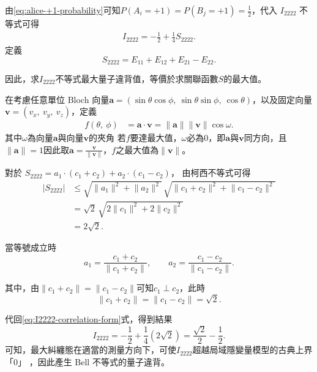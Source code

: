 \documentclass[12pt, a4paper, twoside, reqno]{article}
\begin{document}
\noindent 由\eqref{eq:alice-+1-probability}可知$P(A_i=+1) = P(B_j=+1) = \frac{1}{2}$，代入 $I_{2222}$ 不等式可得
\begin{equation}
\begin{aligned}
    I_{2222} = -\frac{1}{2}+\frac{1}{4}S_{2222}.
\end{aligned}
\label{eq:I2222-correlation-form}
\end{equation}
定義
\begin{equation}
    S_{2222} = E_{11}+E_{12}+E_{21}-E_{22}.
\end{equation}

\noindent 因此，求$I_{2222}$不等式最大量子違背值，等價於求關聯函數$S$的最大值。

\indent 在考慮任意單位 Bloch 向量$\bm{a} = (\sin\theta\cos\phi,~\sin\theta\sin\phi,~\cos\theta)$，以及固定向量$\bm{v} = (v_x,~v_y,~v_z)$，定義
\[
\begin{aligned}
    f(\theta,~\phi) 
    &= \bm{a}\cdot\bm{v}=\|\bm{a}\|\|\bm{v}\|\cos\omega.
\end{aligned}
\]
其中$\omega$為向量$\bm{a}$與向量$\bm{v}$的夾角
\noindent 若$f$要達最大值，$\omega$必為0，即$\bm{a}$與$\bm{v}$同方向，且$\|\bm{a}\|=1$因此取$\bm{a}=\frac{\bm{v}}{\|\bm{v}\|}$，$f$之最大值為$\|\bm{v}\|$。

\noindent 對於
\(S_{2222}
= a_1\cdot(c_1+c_2)+a_2\cdot(c_1-c_2)\)，
由柯西不等式可得
\begin{equation}
\begin{aligned}
\lvert S_{2222}\rvert
&\leq
\sqrt{\lVert a_1\rVert^2+\lVert a_2\rVert^2}\,
\sqrt{
  \lVert c_1+c_2\rVert^2+
  \lVert c_1-c_2\rVert^2
}                                                   \\
&=
\sqrt{2}\,
\sqrt{2\lVert c_1\rVert^2+2\lVert c_2\rVert^2}      \\
&= 2\sqrt{2}.
\end{aligned}
\label{eq:chsh-bound}
\end{equation}

\noindent 當等號成立時
\[
    a_1 = \frac{c_1+c_2}{\|c_1+c_2\|},\qquad a_2=\frac{c_1-c_2}{\|c_1-c_2\|}.
    \]

\noindent 其中，由$\|c_1+c_2\|=\|c_1-c_2\|$可知$c_1\perp c_2$，此時
\[
    \|c_1+c_2\|=\|c_1-c_2\|=\sqrt2.
    \]

\noindent 代回\eqref{eq:I2222-correlation-form}式，得到結果
\begin{equation}
    I_{2222} = -\frac{1}{2}+\frac{1}{4}(2\sqrt2) = \frac{\sqrt2}{2}-\frac{1}{2}.
\end{equation}
\noindent 可知，最大糾纏態在適當的測量方向下，可使$I_{2222}$超越局域隱變量模型的古典上界「$0$」 ，因此產生 Bell 不等式的量子違背。
\end{document}
